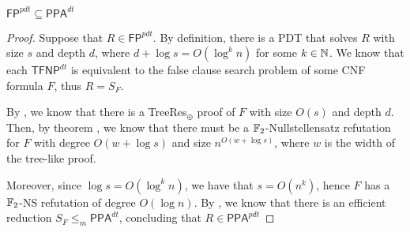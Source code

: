 \begin{theorem}
    \label{main_thm}
    $\mathsf{FP}^{pdt} \subseteq \mathsf{PPA}^{dt}$
\end{theorem}

\begin{proof}
 Suppose that $R \in \mathsf{FP}^{pdt}$. By definition, there is a PDT that solves $R$ with size $s$ and depth $d$, where $d+\log s = O(\log^k n)$ for some $k \in \mathbb{N}$. We know that each $\textsf{TFNP}^{dt}$ is equivalent to the false clause search problem of some CNF formula $F$, thus $R = S_F$.
    
 By , we know that there is a \textsf{TreeRes}$_{\oplus}$ proof of $F$ with size $O(s)$ and depth $d$. Then, by theorem , we know that there must be a $\mathbb{F}_2$-Nullstellensatz refutation for $F$ with degree $O(w + \log s)$ and size $n^{O(w + \log s)}$, where $w$ is the width of the tree-like proof.
 
 Moreover, since $\log s = O(\log^k n)$, we have that $s = O(n^k)$, hence $F$ has a $\mathbb{F}_2$-\textsf{NS} refutation of degree $O(\log n)$. By , we know that there is an efficient reduction $S_F \leq_m \mathsf{PPA}^{dt}$, concluding that $R \in \mathsf{PPA}^{pdt}$

\end{proof}





